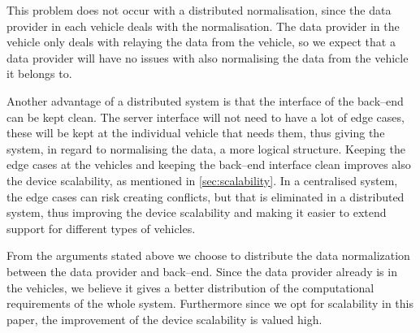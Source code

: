 This problem does not occur with a distributed normalisation, since the data provider in each vehicle deals with the normalisation.
The data provider in the vehicle only deals with relaying the data from the vehicle,
so we expect that a data provider will have no issues with also normalising the data from the vehicle it belongs to.

Another advantage of a distributed system is that the interface of the back--end can be kept clean.
The server interface will not need to have a lot of edge cases,
these will be kept at the individual vehicle that needs them,
thus giving the system, in regard to normalising the data, a more logical structure.
Keeping the edge cases at the vehicles and keeping the back--end interface clean improves also the device scalability,
as mentioned in \cref{sec:scalability}.
In a centralised system, the edge cases can risk creating conflicts, but that is eliminated in a distributed system,
thus improving the device scalability and making it easier to extend support for different types of vehicles.

\bigskip
From the arguments stated above we choose to distribute the data normalization between the data provider and back--end.
Since the data provider already is in the vehicles,
we believe it gives a better distribution of the computational requirements of the whole system.
Furthermore since we opt for scalability in this paper, the improvement of the device scalability is valued high.

